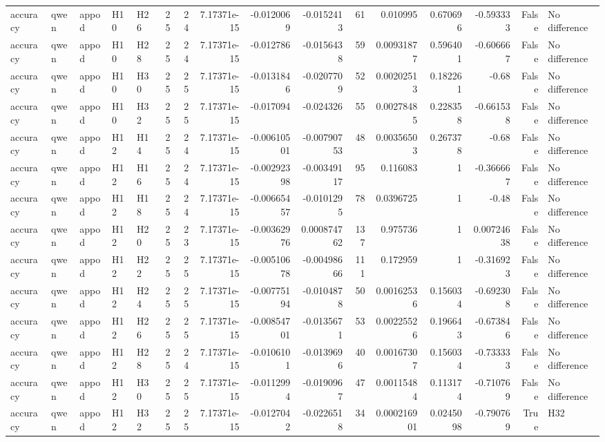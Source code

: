 \begin{longtable}{lllllrrrrrrrrrrl}
accuracy & qwen & appod & H10 & H26 & 25 & 24 & 7.17371e-15 & -0.0120069 & -0.0152413 & 61 & 0.010995 & 0.670696 & -0.593333 & False & No difference \\
accuracy & qwen & appod & H10 & H28 & 25 & 24 & 7.17371e-15 & -0.012786 & -0.0156438 & 59 & 0.00931877 & 0.596401 & -0.606667 & False & No difference \\
accuracy & qwen & appod & H10 & H30 & 25 & 25 & 7.17371e-15 & -0.0131846 & -0.0207709 & 52 & 0.00202513 & 0.182261 & -0.68 & False & No difference \\
accuracy & qwen & appod & H10 & H32 & 25 & 25 & 7.17371e-15 & -0.017094 & -0.024326 & 55 & 0.00278485 & 0.228358 & -0.661538 & False & No difference \\
accuracy & qwen & appod & H12 & H14 & 25 & 24 & 7.17371e-15 & -0.00610501 & -0.00790753 & 48 & 0.00356503 & 0.267378 & -0.68 & False & No difference \\
accuracy & qwen & appod & H12 & H16 & 25 & 24 & 7.17371e-15 & -0.00292398 & -0.00349117 & 95 & 0.116083 & 1 & -0.366667 & False & No difference \\
accuracy & qwen & appod & H12 & H18 & 25 & 24 & 7.17371e-15 & -0.00665457 & -0.0101295 & 78 & 0.0396725 & 1 & -0.48 & False & No difference \\
accuracy & qwen & appod & H12 & H20 & 25 & 23 & 7.17371e-15 & -0.00362976 & 0.000874762 & 137 & 0.975736 & 1 & 0.00724638 & False & No difference \\
accuracy & qwen & appod & H12 & H22 & 25 & 25 & 7.17371e-15 & -0.00510678 & -0.00498666 & 111 & 0.172959 & 1 & -0.316923 & False & No difference \\
accuracy & qwen & appod & H12 & H24 & 25 & 25 & 7.17371e-15 & -0.00775194 & -0.0104878 & 50 & 0.00162536 & 0.156034 & -0.692308 & False & No difference \\
accuracy & qwen & appod & H12 & H26 & 25 & 25 & 7.17371e-15 & -0.00854701 & -0.0135671 & 53 & 0.00225526 & 0.196643 & -0.673846 & False & No difference \\
accuracy & qwen & appod & H12 & H28 & 25 & 24 & 7.17371e-15 & -0.0106101 & -0.0139696 & 40 & 0.00167307 & 0.156034 & -0.733333 & False & No difference \\
accuracy & qwen & appod & H12 & H30 & 25 & 25 & 7.17371e-15 & -0.0112994 & -0.0190967 & 47 & 0.00115484 & 0.113174 & -0.710769 & False & No difference \\
accuracy & qwen & appod & H12 & H32 & 25 & 25 & 7.17371e-15 & -0.0127042 & -0.0226518 & 34 & 0.000216901 & 0.0245098 & -0.790769 & True & H32 \\

\end{longtable}
